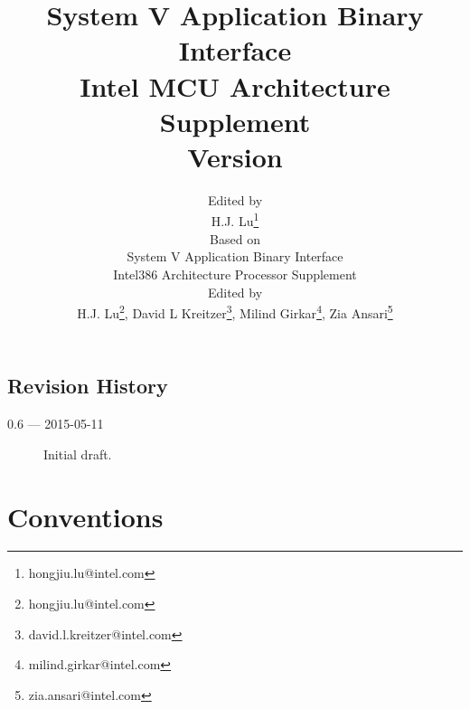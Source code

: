 \documentclass[12pt]{report}
\begin{document}
\author{Edited by\\
  H.J. Lu\thanks{hongjiu.lu@intel.com} \\
  \small
  Based on\\
  \small
  System V Application Binary Interface\\
  \small
  Intel386 Architecture Processor Supplement\\
  \small
  Edited by\\
  \small
  H.J. Lu\thanks{hongjiu.lu@intel.com},
  David L Kreitzer\thanks{david.l.kreitzer@intel.com},
  Milind Girkar\thanks{milind.girkar@intel.com},
  Zia Ansari\thanks{zia.ansari@intel.com}}

\title{System V Application Binary Interface\\
{\Large Intel MCU Architecture Supplement\\
Version \version}}
\maketitle
\tableofcontents
\listoftables
\listoffigures

\section*{Revision History}

\begin{description}

\item[0.6 --- 2015-05-11] Initial draft.
\end{description}







\chapter{Conventions}


\appendix

\end{document}
